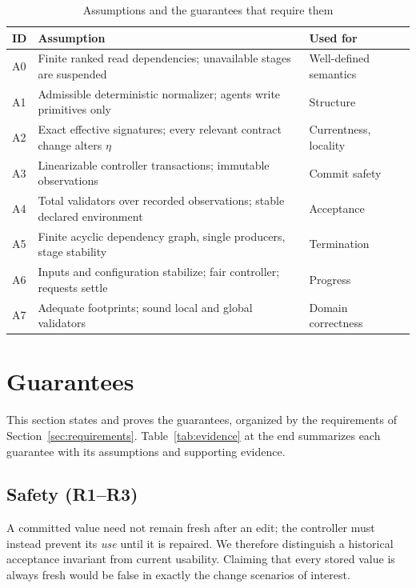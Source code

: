 \documentclass[10pt,journal,compsoc]{IEEEtran}
\theoremstyle{plain}
\theoremstyle{definition}
\begin{document}
\begin{table}[!t]
\centering
\caption{Assumptions and the guarantees that require them}\label{tab:assumptions}
\footnotesize\setlength{\tabcolsep}{3pt}
\begin{tabular}{@{}lP{50mm}l@{}}\toprule
ID & Assumption & Used for\\\midrule
A0 & Finite ranked read dependencies; unavailable stages are suspended & Well-defined semantics\\
A1 & Admissible deterministic normalizer; agents write primitives only & Structure\\
A2 & Exact effective signatures; every relevant contract change alters $\eta$ & Currentness, locality\\
A3 & Linearizable controller transactions; immutable observations & Commit safety\\
A4 & Total validators over recorded observations; stable declared environment & Acceptance\\
A5 & Finite acyclic dependency graph, single producers, stage stability & Termination\\
A6 & Inputs and configuration stabilize; fair controller; requests settle & Progress\\
A7 & Adequate footprints; sound local and global validators & Domain correctness\\\bottomrule
\end{tabular}
\end{table}

\section{Guarantees}\label{sec:guarantees}
This section states and proves the guarantees, organized by the requirements of Section~\ref{sec:requirements}. Table~\ref{tab:evidence} at the end summarizes each guarantee with its assumptions and supporting evidence.

\subsection{Safety (R1--R3)}
A committed value need not remain fresh after an edit; the controller must instead prevent its \emph{use} until it is repaired. We therefore distinguish a historical acceptance invariant from current usability. Claiming that every stored value is always fresh would be false in exactly the change scenarios of interest.
\end{document}
